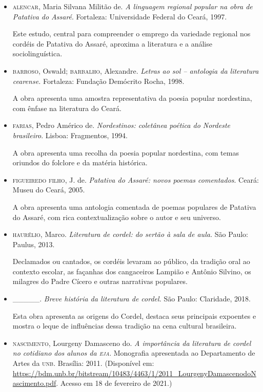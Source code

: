 \documentclass[12pt]{extarticle}
\begin{document}
\begin{itemize}
\item\textsc{alencar}, Maria Silvana Militão de. \textit{A linguagem regional
  popular na obra de Patativa do Assaré}. Fortaleza: Universidade
  Federal do Ceará, 1997.

Este estudo, central para compreender o emprego da variedade regional
nos cordéis de Patativa do Assaré, aproxima a literatura e a análise
sociolinguística.

\item\textsc{barroso}, Oswald; \textsc{barbalho}, Alexandre. \textit{Letras ao sol -- antologia da literatura cearense.} Fortaleza: Fundação Demócrito
  Rocha, 1998.

A obra apresenta uma amostra representativa da poesia popular
nordestina, com ênfase na literatura do Ceará.

\item\textsc{farias}, Pedro Américo de. \textit{Nordestinos: coletânea poética do
  Nordeste brasileiro}. Lisboa: Fragmentos, 1994.

A obra apresenta uma recolha da poesia popular nordestina, com temas
oriundos do folclore e da matéria histórica.

\item\textsc{figueiredo} \textsc{filho}, J. de. \textit{Patativa do Assaré: novos poemas
  comentados}. Ceará: Museu do Ceará, 2005.

A obra apresenta uma antologia comentada de poemas populares de Patativa
do Assaré, com rica contextualização sobre o autor e seu universo.

\item\textsc{haurélio}, Marco. \textit{Literatura de cordel: do sertão à sala de
  aula.} São Paulo: Paulus, 2013.

Declamados ou cantados, os cordéis levaram ao público, da tradição oral
ao contexto escolar, as façanhas dos cangaceiros Lampião e Antônio
Silvino, os milagres do Padre Cícero e outras narrativas populares.

\item \_\_\_\_\_. \textit{Breve história da literatura de cordel.} São
  Paulo: Claridade, 2018.

Esta obra apresenta as origens do Cordel, destaca seus principais
expoentes e mostra o leque de influências dessa tradição na cena
cultural brasileira.

\item\textsc{nascimento}, Lourgeny Damasceno do. \textit{A importância da literatura
  de cordel no cotidiano dos alunos da \textsc{eja}}. Monografia apresentada ao
  Departamento de Artes da \textsc{unb}. Brasília: 2011. (Disponível em:
  \url{https://bdm.unb.br/bitstream/10483/4463/1/2011_LourgenyDamascenodoNascimento.pdf}.
  Acesso em 18 de fevereiro de 2021.)



\end{itemize}
\end{document}
